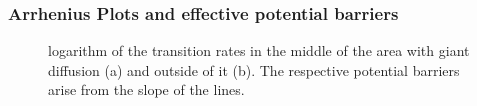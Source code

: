 \documentclass[12pt,a4paper]{article}
\begin{document}
\subsubsection{Arrhenius Plots and effective potential barriers}
\begin{figure}[H]
	\hspace*{-0.5cm}
	\caption{logarithm of the transition rates in the middle of the area with giant diffusion (a) and outside of it (b). The respective potential barriers arise from the slope of the lines.}
	\label{arrhplotsrinzel}
\end{figure}
\end{document}
